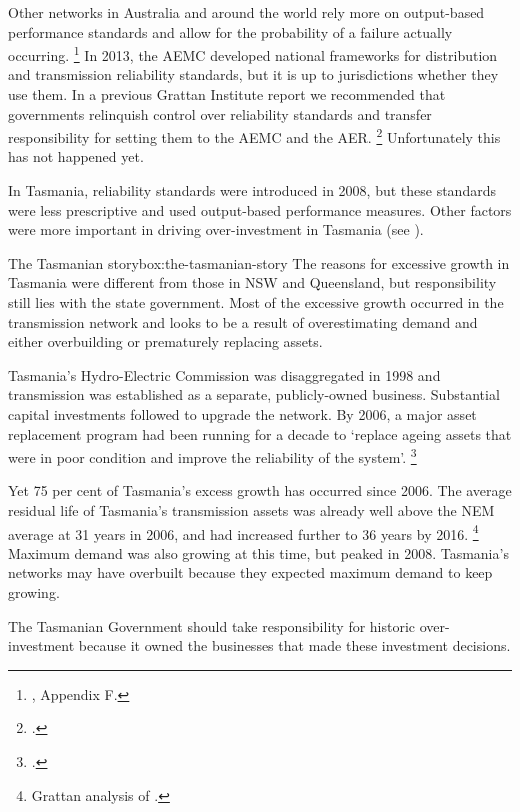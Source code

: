 \documentclass[FrontPage]{grattan}
\begin{document}
Other networks in Australia and around the world rely more on output-based performance standards and allow for the probability of a failure actually occurring.%
\footnote{\textcites{BrattleGroup2012SettingReliabilityStandards}{PC2013ElectricityInquiry}, Appendix F.}
In 2013, the AEMC developed national frameworks for distribution and transmission reliability standards, but it is up to jurisdictions whether they use them. In a previous Grattan Institute report we recommended that governments relinquish control over reliability standards and transfer responsibility for setting them to the AEMC and the AER\@.%
\footcite{WoodHunterOTooleEtAl2012}
Unfortunately this has not happened yet.

In Tasmania, reliability standards were introduced in 2008, but these standards were less prescriptive and used output-based performance measures. Other factors were more important in driving over-investment in Tasmania (see ).

\begin{verysmallbox}[H]{The Tasmanian story}{box:the-tasmanian-story}
The reasons for excessive growth in Tasmania were different from those in NSW and Queensland, but responsibility still lies with the state government. Most of the excessive growth occurred in the transmission network and looks to be a result of overestimating demand and either overbuilding or prematurely replacing assets. 

Tasmania's Hydro-Electric Commission was disaggregated in 1998 and transmission was established as a separate, publicly-owned business. Substantial capital investments followed to upgrade the network. By 2006, a major asset replacement program had been running for a decade to `replace ageing assets that were in poor condition and improve the reliability of the system'.%
\footcite[][169--170]{Pierce2012TasElectricitySupplyReview}  

Yet 75 per cent of Tasmania's excess growth has occurred since 2006. The average residual life of Tasmania's transmission assets was already well above the NEM average at 31 years in 2006, and had increased further to 36 years by 2016.%
\footnote{Grattan analysis of \textcite{AER2018NetworkPerformanceRINResponses}.}
Maximum demand was also growing at this time, but peaked in 2008. Tasmania's networks may have overbuilt because they expected maximum demand to keep growing.

The Tasmanian Government should take responsibility for historic over-investment because it owned the businesses that made these investment decisions.
\end{verysmallbox}
\end{document}
